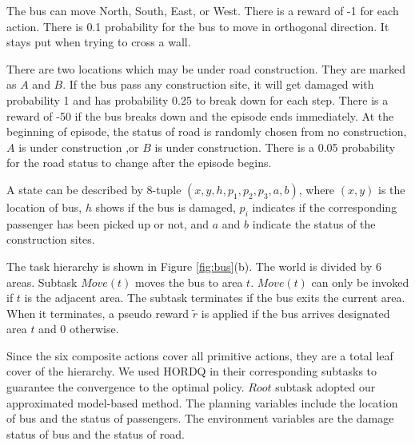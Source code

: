 \documentclass{article} %
\begin{document}
The bus can move North, South, East, or West. There is a reward of -1 for each action.
There is 0.1 probability for the bus to move in orthogonal direction. It stays put 
when trying to cross a wall. 

There are two locations which may be under road construction. They are marked as 
$A$ and $B$. If the bus pass any construction site, it will get damaged with probability 1 and has probability
0.25 to break down for each step. There is a reward of -50 if the bus breaks down and the episode ends immediately. 
At the beginning of episode, the status of road is randomly chosen from no construction, $A$ is under construction
,or $B$ is under construction. There is a 0.05 probability for the road status to change after the episode begins.


A state can be described by 8-tuple $(x, y, h, p_1, p_2, p_3, a, b)$, where $(x, y)$ is the location of 
bus, $h$ shows if the bus is damaged, $p_i$ indicates if the corresponding passenger has been picked up or not,
and $a$ and $b$ indicate the status of the construction sites.

The task hierarchy is shown in Figure \ref{fig:bus}(b). 
The world is divided by 6 areas. Subtask $Move(t)$ moves the bus to area $t$. 
$Move(t)$ can only be invoked if $t$ is the adjacent area.
The subtask terminates if the bus exits the current area.
When it terminates, a pseudo reward $\tilde{r}$ is applied if the bus arrives designated area $t$ and 0 otherwise.

Since the six composite actions cover all primitive actions, they are a total leaf cover of the hierarchy.
We used HORDQ in their corresponding subtasks to guarantee the convergence to the optimal
policy. $Root$ subtask adopted our approximated model-based method. The planning variables include 
the location of bus and the status of passengers. The environment variables are the 
damage status of bus and the status of road. 
\end{document}
